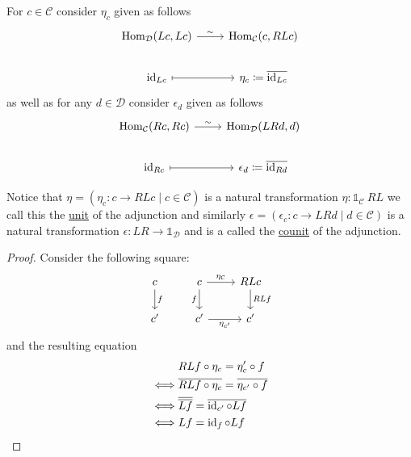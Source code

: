 \begin{rmk}
    For $c \in \mathcal{C}$ consider $\eta_c$ given as follows
    \[
    \begin{tikzcd}
        \Hom_{\mathcal{D}}(Lc,Lc)
        \arrow[r ,"\sim"]
        &
        \Hom_{\mathcal{C}}(c,RLc)
        \\
        \id_{Lc}
        \arrow[r , mapsto]
        &
        \eta_c \coloneqq \overline{\id_{Lc}}
    \end{tikzcd}
    \]
    as well as for any $d \in \mathcal{D}$ consider $\epsilon_d$ given as follows
    \[
    \begin{tikzcd}
        \Hom_{\mathcal{C}}(Rc,Rc)
        \arrow[r ,"\sim"]
        &
        \Hom_{\mathcal{D}}(LRd , d )
        \\
        \id_{Rc}
        \arrow[r , mapsto]
        &
        \epsilon_d \coloneqq \overline{\id_{Rd}}
    \end{tikzcd}
    \]
\end{rmk}

\begin{prop}
    Notice that $\eta=(\eta_c \colon c \to RLc \mid c \in \mathcal{C})$ is a natural transformation $\eta \colon \mathds{1}_{\mathcal{C}} \ RL $ we call this the \underline{unit} of the adjunction and similarly $\epsilon=(\epsilon_c \colon c \to LRd \mid d \in \mathcal{C})$ is a natural transformation $\epsilon\colon LR  \to \mathds{1}_{\mathcal{D}}$ and is a called the \underline{counit} of the adjunction.
\end{prop}

\begin{proof}
    Consider the following square:
    \[
    \begin{tikzcd}
        c 
        \arrow[d, "f"]
        &
        c
        \arrow[r, "\eta_{\mathcal{C}}"]
        \arrow[d, "f"']
        &
        RLc
        \arrow[d, "RLf"]
        \\
        c'
        &
        c'
        \arrow[r, "\eta_{c'}"']
        &
        c'
    \end{tikzcd}
    \]
    and the resulting equation
    \begin{align}
        & RLf \circ \eta_c 
        = \eta_c' \circ f
        \\
        \iff& \overline{RLf \circ \eta_c} 
        = \overline{\eta_{c'} \circ f}
        \\
        \iff& \overline{\overline{Lf}}
        =\overline{\operatorname{id}_{c'} \circ Lf} 
        \\
        \iff&
        Lf = \operatorname{id}_f \circ Lf
    \end{align}
\end{proof}

